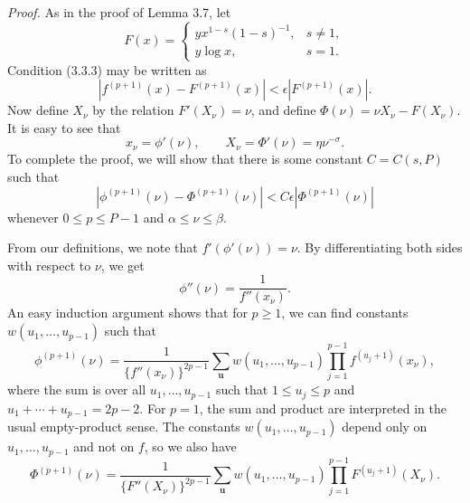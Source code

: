 \documentclass[10pt]{article}
\begin{document}
\noindent\textit{Proof.}
As in the proof of Lemma 3.7, let
\[
 F(x)=
 \begin{cases}
  yx^{1-s}(1-s)^{-1},&s\neq1,\\
  y\log x,&s=1.
 \end{cases}
\]
Condition (3.3.3) may be written as
\begin{equation*}
 |f^{(p+1)}(x)-F^{(p+1)}(x)|
 <\epsilon|F^{(p+1)}(x)|. \tag{3.5.1}
\end{equation*}
Now define $X_\nu$ by the relation $F'(X_\nu)=\nu$, and define
$\Phi(\nu)=\nu X_\nu-F(X_\nu)$. It is easy to see that
\[
 x_\nu=\phi'(\nu),
 \qquad
 X_\nu=\Phi'(\nu)=\eta\nu^{-\sigma}.
\]
To complete the proof, we will show that there is some constant $C=C(s,P)$
such that
\begin{equation*}
 |\phi^{(p+1)}(\nu)-\Phi^{(p+1)}(\nu)|
 <C\epsilon|\Phi^{(p+1)}(\nu)| \tag{3.5.2}
\end{equation*}
whenever $0\leq p\leq P-1$ and $\alpha\leq\nu\leq\beta$.

From our definitions, we note that $f'(\phi'(\nu))=\nu$. By differentiating
both sides with respect to $\nu$, we get
\[
 \phi''(\nu)=\frac1{f''(x_\nu)}.
\]
An easy induction argument shows that for $p\geq1$, we can find constants
$w(u_1,\ldots,u_{p-1})$ such that
\begin{equation*}
 \phi^{(p+1)}(\nu)
 =\frac{1}{\{f''(x_\nu)\}^{2p-1}}
  \sum_{\mathbf u}w(u_1,\ldots,u_{p-1})
  \prod_{j=1}^{p-1}f^{(u_j+1)}(x_\nu), \tag{3.5.3}
\end{equation*}
where the sum is over all $u_1,\ldots,u_{p-1}$ such that
$1\leq u_j\leq p$ and $u_1+\cdots+u_{p-1}=2p-2$. For $p=1$, the sum and
product are interpreted in the usual empty-product sense. The constants
$w(u_1,\ldots,u_{p-1})$ depend only on $u_1,\ldots,u_{p-1}$ and not on $f$,
so we also have
\begin{equation*}
 \Phi^{(p+1)}(\nu)
 =\frac{1}{\{F''(X_\nu)\}^{2p-1}}
  \sum_{\mathbf u}w(u_1,\ldots,u_{p-1})
  \prod_{j=1}^{p-1}F^{(u_j+1)}(X_\nu). \tag{3.5.4}
\end{equation*}
\end{document}
